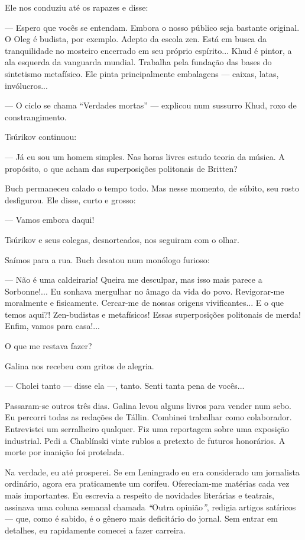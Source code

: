 Ele nos conduziu até os rapazes e disse:

--- Espero que vocês se entendam. Embora o nosso público seja bastante
original. O Oleg é budista, por exemplo. Adepto da escola zen. Está em
busca da tranquilidade no mosteiro encerrado em seu próprio espírito...
Khud é pintor, a ala esquerda da vanguarda mundial. Trabalha pela
fundação das bases do sintetismo metafísico. Ele pinta principalmente
embalagens --- caixas, latas, invólucros...

--- O ciclo se chama ``Verdades mortas'' --- explicou num sussurro Khud,
roxo de constrangimento.

Tsúrikov continuou:

--- Já eu sou um homem simples. Nas horas livres estudo teoria da
música. A propósito, o que acham das superposições politonais de
Britten?

Buch permaneceu calado o tempo todo. Mas nesse momento, de súbito, seu
rosto desfigurou. Ele disse, curto e grosso:

--- Vamos embora daqui!

Tsúrikov e seus colegas, desnorteados, nos seguiram com o olhar.

Saímos para a rua. Buch desatou num monólogo furioso:

--- Não é uma caldeiraria! Queira me desculpar, mas isso mais parece a
Sorbonne!... Eu sonhava mergulhar no âmago da vida do povo. Revigorar-me
moralmente e fisicamente. Cercar-me de nossas origens vivificantes... E
o que temos aqui?! Zen-budistas e metafísicos! Essas superposições
politonais de merda! Enfim, vamos para casa!...

O que me restava fazer?

Galina nos recebeu com gritos de alegria.

--- Cholei tanto --- disse ela ---, tanto. Senti tanta pena de vocês...

Passaram-se outros três dias. Galina levou alguns livros para vender num
sebo. Eu percorri todas as redações de Tállin. Combinei trabalhar como
colaborador. Entrevistei um serralheiro qualquer. Fiz uma reportagem
sobre uma exposição industrial. Pedi a Chablínski vinte rublos a
pretexto de futuros honorários. A morte por inanição foi protelada.

Na verdade, eu até prosperei. Se em Leningrado eu era considerado um
jornalista ordinário, agora era praticamente um corifeu. Ofereciam-me
matérias cada vez mais importantes. Eu escrevia a respeito de novidades
literárias e teatrais, assinava uma coluna semanal chamada
\emph{``}Outra opinião\emph{''}, redigia artigos satíricos --- que, como
é sabido, é o gênero mais deficitário do jornal. Sem entrar em detalhes,
eu rapidamente comecei a fazer carreira.

